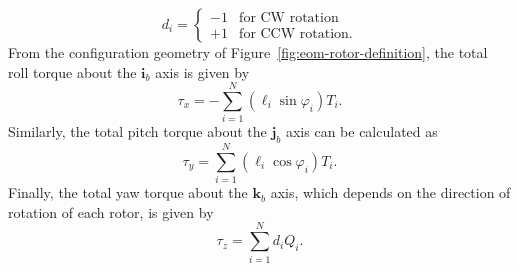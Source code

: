 %
%
\begin{equation}
   d_i = 
   \begin{cases}
      -1 	& \text{for CW rotation} \\
      +1 	& \text{for CCW rotation} .
   \end{cases}
\end{equation}
%
From the configuration geometry of Figure~\ref{fig:eom-rotor-definition}, the total roll torque about the $\mathbf{i}_b$ axis is given by
\begin{equation}
   \tau_x = - \sum\limits_{i=1}^N \left( \ell_i \sin \varphi_i \right) T_i .
\end{equation}
Similarly, the total pitch torque about the $\mathbf{j}_b$ axis can be calculated as
\begin{equation}
   \tau_y = \sum\limits_{i=1}^N \left( \ell_i \cos \varphi_i \right) T_i .
\end{equation}
Finally, the total yaw torque about the $\mathbf{k}_b$ axis, which depends on the direction of rotation of each rotor, is given by
\begin{equation}
   \tau_z = \sum\limits_{i=1}^N d_i Q_i .
\end{equation}
%
%
%
%


